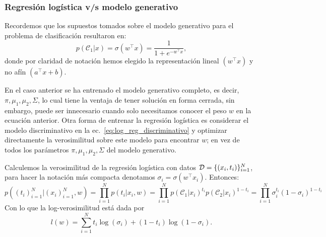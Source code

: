\subsubsection{Regresión logística v/s modelo generativo}

Recordemos que los supuestos tomados sobre el modelo generativo para el problema de clasificación resultaron en:
\begin{equation}
p(\mathcal{C}_1|x) = \sigma(w^\top x) = \frac{1}{1+e^{-w^\top x}} \label{eq:log_reg_discriminativo},
\end{equation}
donde por claridad de notación hemos elegido la representación lineal $(w^\top x)$ y no afín $(a^\top x + b)$. 

En el caso anterior se ha entrenado el modelo generativo completo, es decir, $\pi, \mu_1,\mu_2, \Sigma$, lo cual tiene la ventaja de tener solución en forma cerrada, sin embargo, puede ser innecesario cuando solo necesitamos conocer el peso $w$ en la ecuación anterior. Otra forma de entrenar la  regresión logística es considerar el modelo discriminativo en la  ec.~\eqref{eq:log_reg_discriminativo} y optimizar directamente la verosimilitud sobre  este modelo para encontrar $w$; en vez de todos los parámetros $\pi,\mu_1,\mu_2,\Sigma$ del modelo generativo.

Calculemos la verosimilitud de la regresión logística con datos ${\mathcal D}=\{(x_i,t_i)\}_{i=1}^N$, para hacer la notación más compacta denotamos $\sigma_i = \sigma(w^\top x_i)$. Entonces:
\begin{equation}
p((t_i)_{i=1}^N|(x_i)_{i=1}^N,w) = \prod_{i=1}^{N}p(t_i|x_i,w)= \prod_{i=1}^{N} p(\mathcal{C}_1|x_i)^{t_i} p(\mathcal{C}_2|x_i)^{1-t_i} =  \prod_{i=1}^{N}\sigma_i^{t_i}(1-\sigma_i)^{1-t_i} 
\end{equation}
Con lo que la log-verosimilitud está dada por
\begin{equation}
	l(w) = \sum_{i=1}^N t_i\log(\sigma_i) + (1-t_i)\log(1-\sigma_i).
\end{equation}

